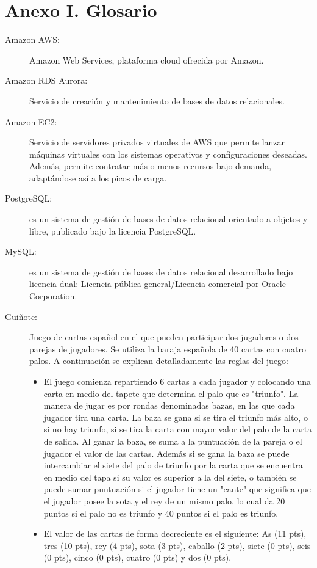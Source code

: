 \documentclass[]{article}
\begin{document}
\section*{Anexo I. Glosario}
\begin{description}
\item[Amazon AWS:] Amazon Web Services, plataforma cloud ofrecida por Amazon. \cite{aws}
\item[Amazon RDS Aurora:] Servicio de creación y mantenimiento de bases de datos relacionales. \cite{aurora}
\item[Amazon EC2:] Servicio de servidores privados virtuales de AWS que permite lanzar máquinas virtuales con los sistemas operativos y configuraciones deseadas. Además, permite contratar más o menos recursos bajo demanda, adaptándose así a los picos de carga. \cite{ec2}
\item[PostgreSQL:] es un sistema de gestión de bases de datos relacional orientado a objetos y libre, publicado bajo la licencia PostgreSQL.
\item[MySQL:] es un sistema de gestión de bases de datos relacional desarrollado bajo licencia dual: Licencia pública general/Licencia comercial por Oracle Corporation.
\item[Guiñote:] Juego de cartas español en el que pueden participar dos jugadores o dos parejas de jugadores. Se utiliza la baraja española de 40 cartas con cuatro palos. A continuación se explican detalladamente las reglas del juego:
\begin{itemize}
\item{El juego comienza repartiendo 6 cartas a cada jugador y colocando una carta en medio del tapete que determina el palo que es "triunfo". La manera de jugar es por rondas denominadas bazas, en las que cada jugador tira una carta. La baza se gana si se tira el triunfo más alto, o si no hay triunfo, si se tira la carta con mayor valor del palo de la carta de salida. Al ganar la baza, se suma a la puntuación de la pareja o el jugador el valor de las cartas. Además si se gana la baza se puede intercambiar el siete del palo de triunfo por la carta que se encuentra en medio del tapa si su valor es superior a la del siete, o también se puede sumar puntuación si el jugador tiene un "cante" que significa que el jugador posee la sota y el rey de un mismo palo, lo cual da 20 puntos si el palo no es triunfo y 40 puntos si el palo es triunfo.}
\item{El valor de las cartas de forma decreciente es el siguiente: As (11 pts), tres (10 pts), rey (4 pts), sota (3 pts), caballo (2 pts), siete (0 pts), seis (0 pts), cinco (0 pts), cuatro (0 pts) y dos (0 pts).}

\end{itemize}
\end{description}
\end{document}
